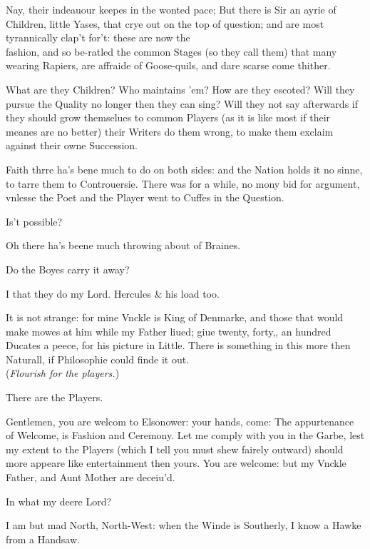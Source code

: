 \documentclass[a5paper,DIV=calc,11pt]{scrbook}
\begin{document}
\begin{drama*}
    \rosinspeaks Nay, their indeauour keepes in the wonted pace; But there is Sir an ayrie of Children, little Yases, that crye out on the top of question; and are most tyrannically clap't for't: these are now the\\
    fashion, and so be-ratled the common Stages (so they call them) that many wearing Rapiers, are affraide of Goose-quils, and dare scarse come thither.
    
    \hamspeaks What are they Children? Who maintains 'em? How are they escoted? Will they pursue the Quality no longer then they can sing? Will they not say afterwards if they should grow themselues to common Players (as it is like most if their meanes are no better) their Writers do them wrong, to make them exclaim against their owne Succession.
    
    \rosinspeaks Faith thrre ha's bene much to do on both sides: and the Nation holds it no sinne, to tarre them to Controuersie. There was for a while, no mony bid for argument, vnlesse the Poet and the Player went to Cuffes in the Question.
    
    \hamspeaks Is't possible?
    
    \guilspeaks Oh there ha's beene much throwing about of Braines.
    
    \hamspeaks Do the Boyes carry it away?
    
    \rosinspeaks I that they do my Lord. Hercules \& his load too.
    
    \hamspeaks It is not strange: for mine Vnckle is King of Denmarke, and those that would make mowes at him while my Father liued; giue twenty, forty,, an hundred Ducates a peece, for his picture in Little. There is something in this more then Naturall, if Philosophie could finde it out.\\
    (\textit{Flourish for the players.})
    
    \guilspeaks There are the Players.
    
    \hamspeaks Gentlemen, you are welcom to Elsonower: your hands, come: The appurtenance of Welcome, is Fashion and Ceremony. Let me comply with you in the Garbe, lest my extent to the Players (which I tell you must shew fairely outward) should more appeare like entertainment then yours. You are welcome: but my Vnckle Father, and Aunt Mother are deceiu'd.
    
    \guilspeaks In what my deere Lord?
    
    \hamspeaks I am but mad North, North-West: when the Winde is Southerly, I know a Hawke from a Handsaw.
    

\end{drama*}
\end{document}

